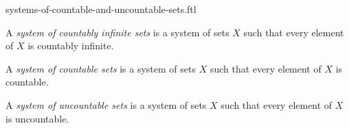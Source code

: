 \documentclass{stex}
\begin{document}
\begin{smodule}{systems-of-countable-and-uncountable-sets.ftl}



\begin{definition*}[forthel,for=system of countably infinite sets]
  A \emph{system of countably infinite sets} is a system of sets $X$ such that every element of $X$ is countably infinite.
\end{definition*}

\begin{definition*}[forthel,for=system of countable sets]
  A \emph{system of countable sets} is a system of sets $X$ such that every element of $X$ is countable.
\end{definition*}

\begin{definition*}[forthel,for=system of uncountable sets]
  A \emph{system of uncountable sets} is a system of sets $X$ such that every element of $X$ is uncountable.
\end{definition*}

\end{smodule}
\end{document}
